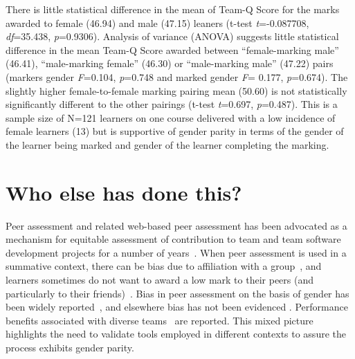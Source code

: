 \documentclass[sigconf, anonymous=false]{acmart}
\begin{document}
There is little statistical difference in the mean of Team-Q Score for the marks awarded to female (46.94) and male (47.15) leaners
(t-test {\emph{t}}=-0.087708, {\emph{df}}=35.438,
{\emph{p}}=0.9306). Analysis of variance (ANOVA) suggests little
statistical difference in the mean Team-Q Score awarded between
``female-marking male'' (46.41), ``male-marking female'' (46.30) or
``male-marking male'' (47.22) pairs (markers gender {\emph{F}}=0.104,
{\emph{p}}=0.748 and marked gender {\emph{F}}= 0.177,
{\emph{p}}=0.674). The slightly higher female-to-female marking
pairing mean (50.60) is not statistically significantly different to
the other pairings (t-test {\emph{t}}=0.697,
{\emph{p}}=0.487).  This is a
sample size of N=121 learners on one course delivered with a low
incidence of female learners (13) but is supportive of gender parity in terms of the gender of the learner being marked and gender of the learner completing the marking.

\section{Who else has done this?}
Peer assessment and related web-based peer assessment has been
advocated as a mechanism for equitable assessment of contribution to
team and team software development projects for a number of
years~\cite{Lejk2001,Clark2005,Raban_Litchfield_2007, Gordon2010,Fagerholm,
	Britton2017,Philips21}. When peer assessment is
used in a summative context, there can be bias due to affiliation with
a group~\cite{Cestone2008}, and learners sometimes do not want to
award a low mark to their peers (and particularly to
their friends)~\cite{Sridharam2003}. Bias in peer assessment on the
basis of gender has been widely
reported~\cite{Heels2019,Stonewall2018}, and elsewhere bias has not
been evidenced \cite{Tucker2014,Falchikov1997}. Performance benefits associated with diverse teams~\cite{HBR206} are reported. This mixed picture
highlights the need to validate tools employed in different contexts
to assure the process exhibits gender parity.
\end{document}
